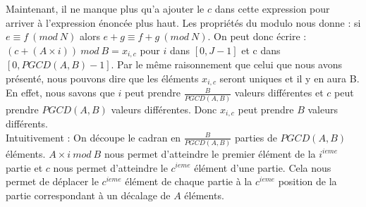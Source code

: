 Maintenant, il ne manque plus qu'a ajouter le $c$ dans cette expression pour arriver à l'expression énoncée plus haut. Les propriétés du modulo nous donne : si $e ≡ f\ (mod\ N)$ alors $e+g ≡ f+g\ (mod\ N)$. On peut donc écrire : $(c +(A\times i))\ mod\ B = x_{i,c}$ pour $i$ dans $[0, J-1]$ et c dans $[0, PGCD(A,B) -1]$. Par le même raisonnement que celui que nous avons présenté, nous pouvons dire que les éléments $x_{i,c}$ seront uniques et il y en aura B.\\
En effet, nous savons que $i$ peut prendre $\frac{B}{PGCD(A,B)}$ valeurs différentes et $c$ peut prendre $PGCD(A,B)$ valeurs différentes. Donc $x_{i,c}$ peut prendre $B$ valeurs différents.\\

Intuitivement : On découpe le cadran en $\frac{B}{PGCD(A,B)}$ parties de $PGCD(A,B)$ éléments. 
$A\times i\ mod\ B$ nous permet d'atteindre le premier élément de la $i^{ieme}$ partie et $c$ nous permet d'atteindre le $c^{ieme}$ élément d'une partie. 
Cela nous permet de déplacer le $c^{ieme}$ élément de chaque partie à la $c^{ieme}$ position de la partie correspondant à un décalage de $A$ éléments.